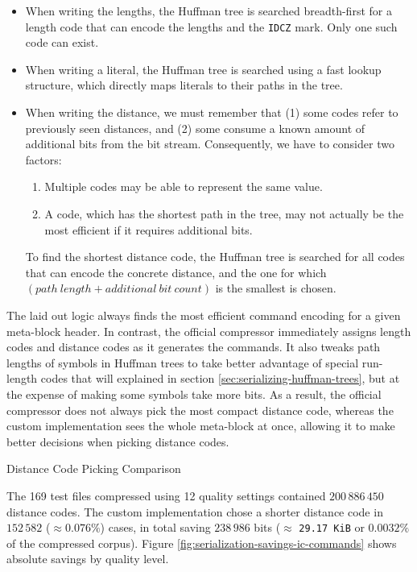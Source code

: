 \documentclass[english,master,dept460,male,cpp,cpdeclaration]{diploma}
\makeatletter
\renewcommand\paragraph
	{\@startsection{paragraph}{4}{\z@}
	{-3.25ex plus 1ex minus .2ex}
	{1.5ex plus .2ex}
	{\normalfont\normalsize\bfseries}}
\newcommand{\subfoursection}[1]{\paragraph{#1}}
\newcommand{\nosep}{\itemsep0em}
\makeatother
\begin{document}
		\begin{itemize} \nosep
			\item When writing the lengths, the Huffman tree is searched breadth-first for a length code that can encode the lengths and the \verb|IDCZ| mark. Only one such code can exist.
			\item When writing a literal, the Huffman tree is searched using a fast lookup structure, which directly maps literals to their paths in the tree.
			\item When writing the distance, we must remember that (1) some codes refer to previously seen distances, and (2) some consume a known amount of additional bits from the bit stream. Consequently, we have to consider two factors:
				\begin{enumerate} \nosep
					\item Multiple codes may be able to represent the same value.
					\item A code, which has the shortest path in the tree, may not actually be the most efficient if it requires additional bits.
				\end{enumerate}
			To find the shortest distance code, the Huffman tree is searched for all codes that can encode the concrete distance, and the one for which $(path\ length + additional\ bit\ count)$ is the smallest is chosen.
		\end{itemize}
		
		\noindent
		The laid out logic always finds the most efficient command encoding for a given meta-block header. In contrast, the official compressor immediately assigns length codes and distance codes as it generates the commands. It also tweaks path lengths of symbols in Huffman trees to take better advantage of special run-length codes that will explained in section \ref{sec:serializing-huffman-trees}, but at the expense of making some symbols take more bits. As a result, the official compressor does not always pick the most compact distance code, whereas the custom implementation sees the whole meta-block at once, allowing it to make better decisions when picking distance codes.
		
			\subfoursection{Distance Code Picking Comparison}
			
			The 169 test files compressed using 12 quality settings contained $200\,886\,450$ distance codes. The custom implementation chose a shorter distance code in $152\,582$ ($\approx 0.076 \%$) cases, in total saving $238\,986$ bits ($\approx$ \verb|29.17 KiB| or $0.0032 \%$ of the compressed corpus). Figure \ref{fig:serialization-savings-ic-commands} shows absolute savings by quality level.
			
\end{document}
